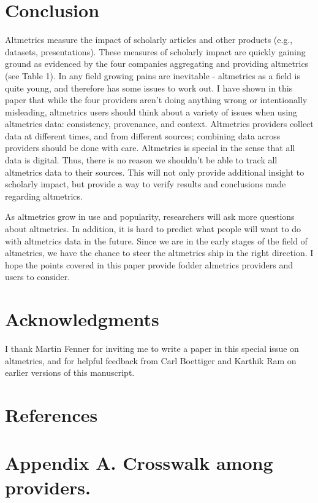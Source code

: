 \documentclass[letterpaper,superscriptaddress,showkeys,longbibliography]{revtex4-1}\usepackage{graphicx, color}
\begin{document}
\section*{Conclusion}

Altmetrics measure the impact of scholarly articles and other products (e.g., datasets, presentations). These measures of scholarly impact are quickly gaining ground as evidenced by the four companies aggregating and providing altmetrics (see Table 1). In any field growing pains are inevitable - altmetrics as a field is quite young, and therefore has some issues to work out. I have shown in this paper that while the four providers aren't doing anything wrong or intentionally misleading, altmetrics users should think about a variety of issues when using altmetrics data: consistency, provenance, and context. Altmetrics providers collect data at different times, and from different sources; combining data across providers should be done with care. Altmetrics is special in the sense that all data is digital. Thus, there is no reason we shouldn't be able to track all altmetrics data to their sources. This will not only provide additional insight to scholarly impact, but provide a way to verify results and conclusions made regarding altmetrics. 

As altmetrics grow in use and popularity, researchers will ask more questions about altmetrics. In addition, it is hard to predict what people will want to do with altmetrics data in the future. Since we are in the early stages of the field of altmetrics, we have the chance to steer the altmetrics ship in the right direction. I hope the points covered in this paper provide fodder almetrics providers and users to consider.

\section*{Acknowledgments}

I thank Martin Fenner for inviting me to write a paper in this special issue on altmetrics, and for helpful feedback from Carl Boettiger and Karthik Ram on earlier versions of this manuscript.
  
\section*{References}


\section*{Appendix A. Crosswalk among providers.}
\end{document}

